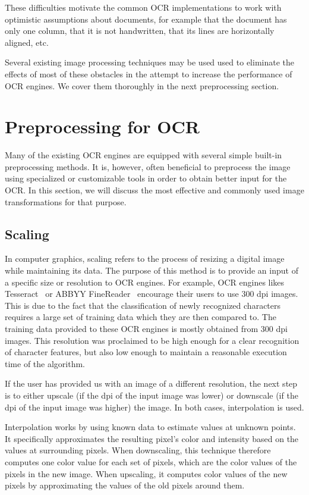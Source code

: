 These difficulties motivate the common OCR implementations to work with optimistic assumptions about documents, for example that the document has only one column, that it is not handwritten, that its lines are horizontally aligned, etc.

Several existing image processing techniques may be used used to eliminate the effects of most of
these obstacles in the attempt to increase the performance of OCR engines. We cover them thoroughly in the next preprocessing section.

\section{Preprocessing for OCR}

Many of the existing OCR engines are equipped with several simple built-in preprocessing methods. It is, however, often beneficial to preprocess the image using specialized or customizable tools in order to obtain better input for the OCR. In this section, we will discuss the most effective and commonly used image transformations for that purpose.

\subsection{Scaling} \label{scaling}

In computer graphics, scaling refers to the process of resizing a digital image while maintaining its data. The purpose of this method is to provide an input of a specific size or resolution to OCR engines. For example, OCR engines likes Tesseract~\cite{TesseractQual} or ABBYY FineReader~\cite{ABBYYdpi} encourage their users to use 300 dpi images. This is due to the fact that the classification of newly recognized characters requires a large set of training data which they are then compared to. The training data provided to these OCR engines is mostly obtained from 300 dpi images. This resolution was proclaimed to be high enough for a clear recognition of character features, but also low enough to maintain a reasonable execution time of the algorithm. 

If the user has provided us with an image of a different resolution, the next step is to either upscale (if the dpi of the input image was lower) or downscale (if the dpi of the input image was higher) the image. In both cases, interpolation is used. 

Interpolation works by using known data to estimate values at unknown points. It specifically approximates the resulting pixel's color and intensity based on the values at surrounding pixels. When downscaling, this technique therefore computes one color value for each set of pixels, which are the color values of the pixels in the new image. When upscaling, it computes color values of the new pixels by approximating the values of the old pixels around them.

